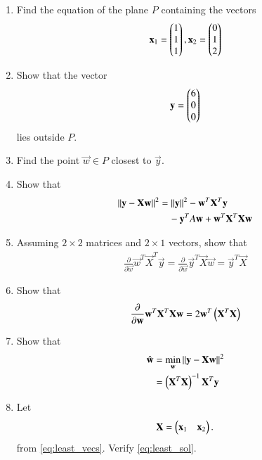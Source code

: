 \renewcommand{\theequation}{\theenumi}
\begin{enumerate}[label=\arabic*.,ref=\thesubsection.\theenumi]
\item Find the equation of the plane $P$
containing the vectors 
%
\begin{align}
\label{eq:least_vecs}
\mathbf{x}_1 = \begin{pmatrix}1 \\ 1 \\ 1\end{pmatrix}
,
\mathbf{x}_2 = \begin{pmatrix}0 \\ 1 \\ 2\end{pmatrix}
\end{align}
%
\item Show that the vector 
\begin{align}
\mathbf{y} = \begin{pmatrix}6 \\ 0 \\ 0\end{pmatrix}
\end{align}
lies outside $P$.
\item Find the point $\vec{w} \in P$ closest to $\vec{y}$.
\item Show that
\begin{align}
\left\lVert\mathbf{y}-\mathbf{X}\mathbf{w}\right\rVert^2 &= \left\lVert\mathbf{y}\right\rVert^2 - \mathbf{w}^T\mathbf{X}^T\mathbf{y} 
\\
& \quad - \mathbf{y}^TA\mathbf{w}+\mathbf{w}^T\mathbf{X}^T\mathbf{X}\mathbf{w}
\end{align}
%
\item Assuming $2\times 2$ matrices and $2 \times 1$ vectors, show that
\begin{align}
\frac{\partial}{\partial\vec{w}}\vec{w}^T\vec{X}^T\vec{y} = \frac{\partial}{\partial\vec{w}}\vec{y}^T\vec{X}\vec{w} = 
\vec{y}^T\vec{X}
\end{align}
\item Show that
\begin{align}
\frac{\partial}{\partial\mathbf{w}}\mathbf{w}^T\mathbf{X}^T\mathbf{X}\mathbf{w} = 2\mathbf{w}^T\left(\mathbf{X}^T\mathbf{X}\right)
\end{align}
\item Show that 
\begin{align}
\hat{\mathbf{w}} &= \min_{\mathbf{w}}\left\lVert\mathbf{y}-\mathbf{X}\mathbf{w}\right\rVert^2
\\
 &= \left(\mathbf{X}^T\mathbf{X}\right)^{-1}\mathbf{X}^T \mathbf{y}
\label{eq:least_sol}
\end{align}
\item Let 
\begin{align}
\mathbf{X} = \begin{pmatrix}\mathbf{x}_1 & \mathbf{x}_2\end{pmatrix}.
\end{align}
from \eqref{eq:least_vecs}.
Verify \eqref{eq:least_sol}.
\end{enumerate}
